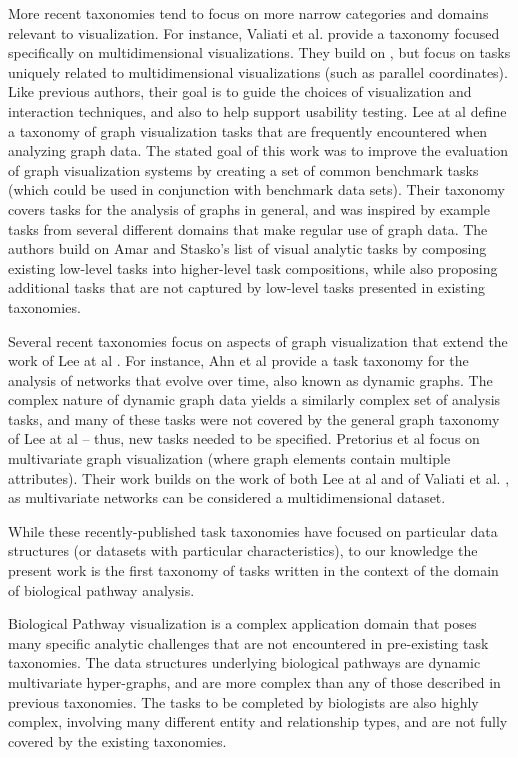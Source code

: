 More recent taxonomies tend to focus on more narrow categories and domains relevant to visualization.
For instance, Valiati et al. \cite{Valiati2006} provide a taxonomy focused specifically on multidimensional visualizations.
They build on \cite{Wehrend1990}, but focus on tasks uniquely related to multidimensional visualizations (such as parallel coordinates).
Like previous authors, their goal is to guide the choices of visualization and interaction techniques, and also to help support usability testing.
Lee at al \cite{Lee2006} define a taxonomy of graph visualization tasks that are frequently encountered when analyzing graph data.
The stated goal of this work was to improve the evaluation of graph visualization systems by creating a set of common benchmark tasks (which could be used in conjunction with benchmark data sets).
Their taxonomy covers tasks for the analysis of graphs in general, and was inspired by example tasks from several different domains that make regular use of graph data.
The authors build on Amar and Stasko's \cite{Amar2005} list of visual analytic tasks by composing existing low-level tasks into higher-level task compositions, while also proposing additional tasks that are not captured by low-level tasks presented in existing taxonomies.

Several recent taxonomies focus on aspects of graph visualization that extend the work of Lee at al \cite{Lee2006}.
For instance, Ahn et al \cite{Ahn2014} provide a task taxonomy for the analysis of networks that evolve over time, also known as dynamic graphs.
The complex nature of dynamic graph data yields a similarly complex set of analysis tasks, and many of these tasks were not covered by the general graph taxonomy of Lee at al \cite{Lee2006} -- thus, new tasks needed to be specified.
Pretorius et al \cite{Pretorius2014} focus on multivariate graph visualization (where graph elements contain multiple attributes).
Their work builds on the work of both Lee at al \cite{Lee2006} and of Valiati et al. \cite{Valiati2006}, as multivariate networks can be considered a multidimensional dataset.

While these recently-published task taxonomies have focused on particular data structures (or datasets with particular characteristics), to our knowledge the present work is the first taxonomy of tasks written in the context of the domain of biological pathway analysis.

Biological Pathway visualization is a complex application domain that poses many specific analytic challenges that are not encountered in pre-existing task taxonomies.
The data structures underlying biological pathways are dynamic multivariate hyper-graphs, and are more complex than any of those described in previous taxonomies.
The tasks to be completed by biologists are also highly complex, involving many different entity and relationship types, and are not fully covered by the existing taxonomies.

